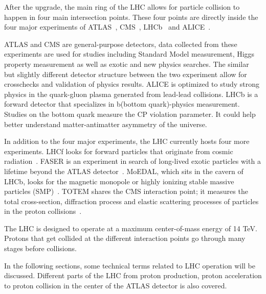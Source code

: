 After the upgrade, the main ring of the LHC allows for particle collision to happen in four main intersection points. These four points are directly inside the four major experiments of ATLAS~\cite{ATLAS:1999vwa}, CMS~\cite{CMS:2006myw}, LHCb~\cite{lhcb2001technical} and ALICE~\cite{Cortese:519145}.

ATLAS and CMS are general-purpose detectors, data collected from these experiments are used for studies including Standard Model measurement, Higgs property measurement as well as exotic and new physics searches. The similar but slightly different detector structure between the two experiment allow for crosschecks and validation of physics results. ALICE is optimized to study strong physics in the quark-gluon plasma generated from lead-lead collisions. LHCb is a forward detector that specializes in b(bottom quark)-physics measurement. Studies on the bottom quark measure the CP violation parameter. It could help better understand matter-antimatter asymmetry of the universe. 

In addition to the four major experiments, the LHC currently hosts four more experiments. LHCf looks for forward particles that originate from cosmic radiation~\cite{Adriani:926196}. FASER is an experiment in search of long-lived exotic particles with a lifetime beyond the ATLAS detector~\cite{Ariga:2651328}. MoEDAL, which sits in the cavern of LHCb, looks for the magnetic monopole or highly ionizing stable massive particles (SMP)~\cite{Pinfold:1181486}. TOTEM shares the CMS interaction point; it measures the total
cross-section, diffraction process and elastic scattering processes of particles in the proton collisions~\cite{TOTEM:2004hps}. 

The LHC is designed to operate at a maximum center-of-mass energy of 14 TeV. Protons that get collided at the different interaction points go through many stages before collisions. 

In the following sections, some technical terms related to LHC operation will be discussed. Different parts of the LHC from proton production, proton acceleration to proton collision in the center of the ATLAS detector is also covered.

